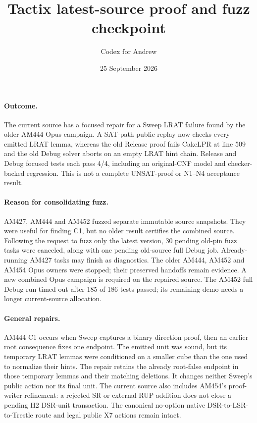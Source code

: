 \documentclass[11pt]{article}
\title{Tactix latest-source proof and fuzz checkpoint}
\author{Codex for Andrew}
\date{25 September 2026}
\begin{document}
\maketitle

\paragraph{Outcome.}
The current source has a focused repair for a Sweep LRAT failure found by the
older AM444 Opus campaign. A SAT-path public replay now checks every emitted
LRAT lemma, whereas the old Release proof fails CakeLPR at line 509 and the old
Debug solver aborts on an empty LRAT hint chain. Release and Debug focused
tests each pass 4/4, including an original-CNF model and checker-backed
regression. This is not a complete UNSAT-proof or N1--N4 acceptance result.

\paragraph{Reason for consolidating fuzz.}
AM427, AM444 and AM452 fuzzed separate immutable source snapshots. They were
useful for finding C1, but no older result certifies the combined source.
Following the request to fuzz only the latest version, 30 pending old-pin
fuzz tasks were canceled, along with one pending old-source full Debug job.
Already-running AM427 tasks may finish as diagnostics. The older AM444, AM452
and AM454 Opus owners were stopped; their preserved handoffs remain evidence.
A new combined Opus campaign is required on the repaired source. The AM452
full Debug run timed out after 185 of 186 tests passed; its remaining demo
needs a longer current-source allocation.

\paragraph{General repairs.}
AM444 C1 occurs when Sweep captures a binary direction proof, then an earlier
root consequence fixes one endpoint. The emitted unit was sound, but its
temporary LRAT lemmas were conditioned on a smaller cube than the one used to
normalize their hints. The repair retains the already root-false endpoint in
those temporary lemmas and their matching deletions. It changes neither
Sweep's public action nor its final unit. The current source also includes
AM454's proof-writer refinement: a rejected SR or external RUP addition does
not close a pending H2 DSR-unit transaction. The canonical no-option native
DSR-to-LSR-to-Trestle route and legal public X7 actions remain intact.
\end{document}
